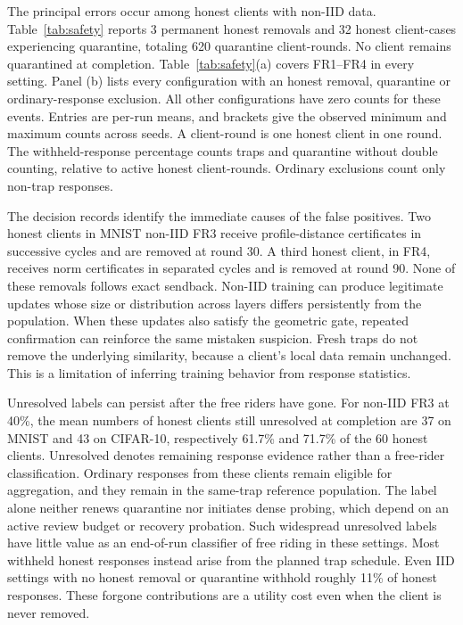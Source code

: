 \documentclass[conference]{IEEEtran}
\makeatletter
\renewcommand{\subsection}{\@startsection{subsection}{2}{\z@}{1.5ex}{0.7ex}{\normalfont\normalsize\itshape}}
\makeatother
\begin{document}
\subsection{Honest-Client Impact}
The principal errors occur among honest clients with non-IID data.
Table~\ref{tab:safety} reports 3 permanent honest removals and
32 honest client-cases experiencing quarantine, totaling
620 quarantine client-rounds. No client remains quarantined at completion.
Table~\ref{tab:safety}(a) covers FR1--FR4 in every setting.
Panel (b) lists every configuration with an honest removal, quarantine
or ordinary-response exclusion. All other configurations have zero
counts for these events. Entries are per-run means, and brackets give
the observed minimum and maximum counts across seeds. A client-round
is one honest client in one round. The withheld-response percentage
counts traps and quarantine without double counting, relative to active
honest client-rounds. Ordinary exclusions count only non-trap responses.

The decision records identify the immediate causes of the false positives.
Two honest clients in MNIST non-IID FR3 receive profile-distance
certificates in successive cycles and are removed at round 30. A third
honest client, in FR4, receives norm certificates in separated cycles
and is removed at round 90. None of these removals follows exact sendback.
Non-IID training can produce legitimate updates whose size or distribution
across layers differs persistently from the population. When these updates
also satisfy the geometric gate, repeated confirmation can reinforce the
same mistaken suspicion. Fresh traps do not remove the underlying
similarity, because a client's local data remain unchanged. This is a
limitation of inferring training behavior from response statistics.

Unresolved labels can persist after the free riders have gone.
For non-IID FR3 at 40\%, the mean numbers of honest clients still
unresolved at completion are 37 on MNIST and 43 on CIFAR-10, respectively
61.7\% and 71.7\% of the 60 honest clients. Unresolved denotes remaining
response evidence rather than a free-rider classification.
Ordinary responses from these clients remain
eligible for aggregation, and they remain in the same-trap reference
population. The label alone neither renews quarantine nor initiates dense
probing, which depend on an active review budget or recovery probation.
Such widespread unresolved labels have little value as an end-of-run
classifier of free riding in these settings.
Most withheld honest responses instead arise from the planned trap
schedule. Even IID settings with no honest removal or quarantine withhold
roughly 11\% of honest responses. These forgone contributions are a
utility cost even when the client is never removed.
\end{document}

